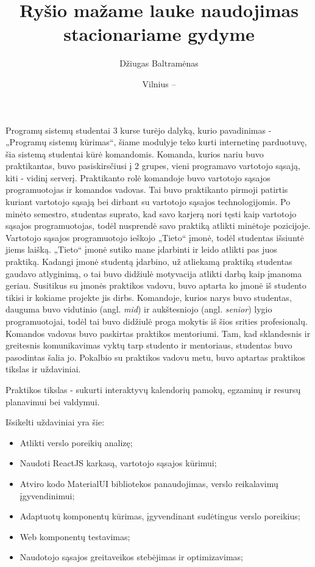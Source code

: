 \documentclass{VUMIFPSbakalaurinis}
\title{Ryšio mažame lauke naudojimas stacionariame gydyme}
\author{Džiugas Baltramėnas}
\date{Vilnius – \the\year}
\begin{document}
\maketitle

\tableofcontents

Programų sistemų studentai 3 kurse turėjo dalyką, kurio pavadinimas - „Programų sistemų kūrimas“, šiame modulyje teko kurti internetinę parduotuvę, šia sistemą studentai kūrė komandomis. Komanda, kurios nariu buvo praktikantas, buvo pasiskirsčiusi į 2 grupes, vieni programavo vartotojo sąsają, kiti - vidinį serverį. Praktikanto rolė komandoje buvo vartotojo sąsajos programuotojas ir komandos vadovas. Tai buvo praktikanto pirmoji patirtis kuriant vartotojo sąsają bei dirbant su vartotojo sąsajos technologijomis. Po minėto semestro, studentas suprato, kad savo karjerą nori tęsti kaip vartotojo sąsajos programuotojas, todėl nusprendė savo praktiką atlikti minėtoje pozicijoje. Vartotojo sąsajos programuotojo ieškojo „Tieto“ įmonė, todėl studentas išsiuntė jiems laišką. „Tieto“ įmonė sutiko mane įdarbinti ir leido atlikti pas juos praktiką. Kadangi įmonė studentą įdarbino, už atliekamą praktiką studentas gaudavo atlyginimą, o tai buvo didžiulė motyvacija atlikti darbą kaip įmanoma geriau. Susitikus su įmonės praktikos vadovu, buvo aptarta ko įmonė iš studento tikisi ir kokiame projekte jis dirbs. Komandoje, kurios narys buvo studentas, dauguma buvo vidutinio (angl. \textit{mid}) ir aukštesniojo (angl. \textit{senior}) lygio programuotojai, todėl tai buvo didžiulė proga mokytis iš šios srities profesionalų. Komandos vadovas buvo paskirtas praktikos mentoriumi. Tam, kad sklandesnis ir greitesnis komunikavimas vyktų tarp studento ir mentoriaus, studentas buvo pasodintas šalia jo. Pokalbio su praktikos vadovu metu, buvo aptartas praktikos tikslas ir uždaviniai.

Praktikos tikslas - sukurti interaktyvų kalendorių pamokų, egzaminų ir resursų planavimui bei valdymui.

Išsikelti uždaviniai yra šie:
\begin{itemize}
    \item Atlikti verslo poreikių analizę;
    \item Naudoti ReactJS karkasą, vartotojo sąsajos kūrimui;
    \item Atviro kodo MaterialUI bibliotekos panaudojimas, verslo reikalavimų įgyvendinimui;
    \item Adaptuotų komponentų kūrimas, įgyvendinant sudėtingus verslo poreikius;
    \item Web komponentų testavimas;
    \item Naudotojo sąsajos greitaveikos stebėjimas ir optimizavimas;
\end{itemize}
\end{document}
